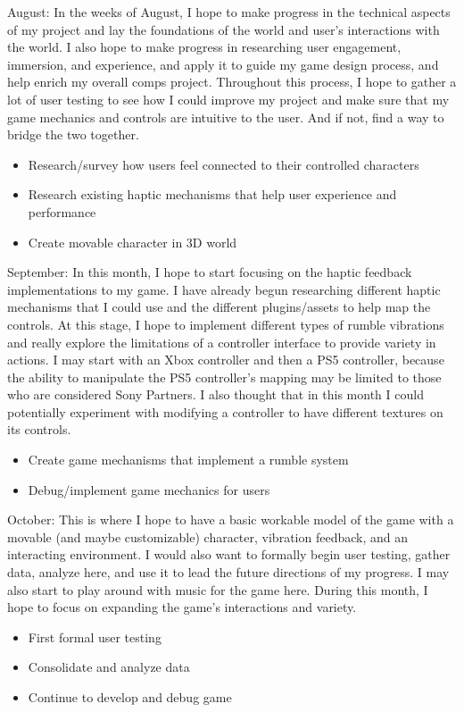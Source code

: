 \documentclass[10pt,twocolumn]{article}
\begin{document}
August:
In the weeks of August, I hope to make progress in the technical aspects of my project and lay the foundations of the world and user's interactions with the world. I also hope to make progress in researching user engagement, immersion, and experience, and apply it to guide my game design process, and help enrich my overall comps project. Throughout this process, I hope to gather a lot of user testing to see how I could improve my project and make sure that my game mechanics and controls are intuitive to the user. And if not, find a way to bridge the two together.
\begin{itemize}
\item Research/survey how users feel connected to their controlled characters
\item Research existing haptic mechanisms that help user experience and performance
\item Create movable character in 3D world
\end{itemize}

September:
In this month, I hope to start focusing on the haptic feedback implementations to my game. I have already begun researching different haptic mechanisms that I could use and the different plugins/assets to help map the controls. At this stage, I hope to implement different types of rumble vibrations and really explore the limitations of a controller interface to provide variety in actions. I may start with an Xbox controller and then a PS5 controller, because the ability to manipulate the PS5 controller's mapping may be limited to those who are considered Sony Partners. I also thought that in this month I could potentially experiment with modifying a controller to have different textures on its controls.
\begin{itemize}
\item Create game mechanisms that implement a rumble system
\item Debug/implement game mechanics for users
\end{itemize}

October:
This is where I hope to have a basic workable model of the game with a movable (and maybe customizable) character, vibration feedback, and an interacting environment. I would also want to formally begin user testing, gather data, analyze here, and use it to lead the future directions of my progress. I may also start to play around with music for the game here. During this month, I hope to focus on expanding the game's interactions and variety.
\begin{itemize}
\item First formal user testing
\item Consolidate and analyze data
\item Continue to develop and debug game
\end{itemize}
\end{document}
